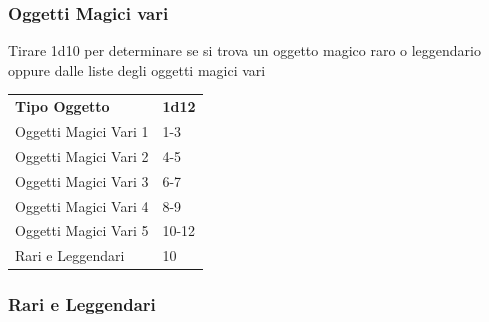 \begin{multicols}{2}
	\subsubsection{Oggetti Magici vari}

	Tirare 1d10 per determinare se si trova un oggetto magico raro o leggendario oppure dalle liste degli oggetti magici vari

	\medskip

	\begin{tabular}{ll}
		\textbf{Tipo Oggetto} & \textbf{1d12}\\
		Oggetti Magici Vari 1&1-3\\
		Oggetti Magici Vari 2&4-5\\
		Oggetti Magici Vari 3&6-7\\
		Oggetti Magici Vari 4&8-9\\
		Oggetti Magici Vari 5&10-12\\
		Rari e Leggendari&10\\
	\end{tabular}

	\medskip


	\subsubsection{Rari e Leggendari}

	\medskip


\end{multicols}

